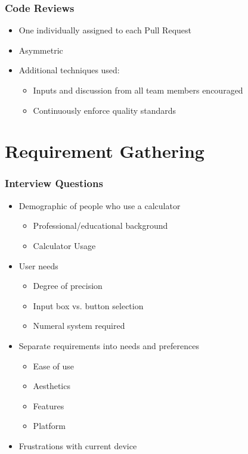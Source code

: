 \documentclass{beamer}
\begin{document}
\begin{frame}
\frametitle{Code Reviews}
 \begin{itemize}
  \item One individually assigned to each Pull Request
  \item Asymmetric
  \item Additional techniques used:
   \begin{itemize}
    \item Inputs and discussion from all team members encouraged
    \item Continuously enforce quality standards
   \end{itemize}
\end{itemize}
\end{frame}



\section{Requirement Gathering}

\begin{frame}
\frametitle{Interview Questions}
\begin{itemize}
 \item Demographic of people who use a calculator
  \begin{itemize}
   \item Professional/educational background
   \item Calculator Usage
  \end{itemize}
 \item User needs
  \begin{itemize}
   \item Degree of precision
   \item Input box vs. button selection
   \item Numeral system required
  \end{itemize}
 \item Separate requirements into needs and preferences
  \begin{itemize}
   \item Ease of use
   \item Aesthetics
   \item Features
   \item Platform
  \end{itemize}
   \item Frustrations with current device
\end{itemize}
\end{frame}
\end{document}
